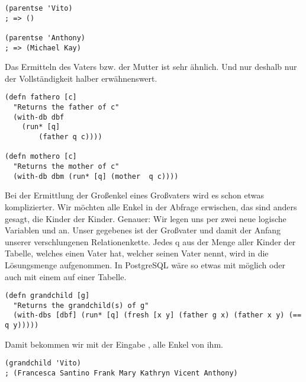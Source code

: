 \begin{lstlisting}
(parentse 'Vito)
; => ()

(parentse 'Anthony)
; => (Michael Kay)
\end{lstlisting}
Das Ermitteln des Vaters bzw. der Mutter ist sehr ähnlich. Und nur deshalb nur der Vollständigkeit halber erwähnenswert.

\begin{lstlisting}
(defn fathero [c]
  "Returns the father of c"
  (with-db dbf 
	(run* [q] 
		(father q c))))

(defn mothero [c]
  "Returns the mother of c"
  (with-db dbm (run* [q] (mother  q c))))
\end{lstlisting}
\noindent
Bei der Ermittlung der Großenkel eines Großvaters wird es schon etwas komplizierter. Wir möchten alle Enkel in der Abfrage erwischen, das sind anders gesagt, die Kinder der Kinder. Genauer: Wir legen uns per  zwei neue logische Variablen  und  an. Unser gegebenes  ist der Großvater und damit der Anfang unserer \dq{}verschlungenen\dq{} Relationenkette. Jedes q aus der Menge aller Kinder der  Tabelle, welches einen Vater  hat, welcher  seinen Vater nennt, wird in die Lösungsmenge aufgenommen. In PostgreSQL wäre so etwas mit  möglich oder auch mit einem  auf einer Tabelle.

\begin{lstlisting}
(defn grandchild [g]
  "Returns the grandchild(s) of g"
  (with-dbs [dbf] (run* [q] (fresh [x y] (father g x) (father x y) (== q y)))))
\end{lstlisting}
\noindent
Damit bekommen wir mit der Eingabe , alle Enkel von ihm.

\begin{lstlisting}
(grandchild 'Vito)
; (Francesca Santino Frank Mary Kathryn Vicent Anthony)
\end{lstlisting}

